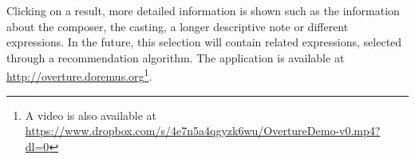 \documentclass[runningheads,a4paper]{llncs}
\begin{document}
Clicking on a result, more detailed information is shown such as the information about the composer, the casting, a longer descriptive note or different expressions. In the future, this selection will contain related expressions, selected through a recommendation algorithm. The application is available at \url{http://overture.doremus.org}\footnote{A video is also available at \url{https://www.dropbox.com/s/4e7n5a4qgyzk6wu/OvertureDemo-v0.mp4?dl=0}}.




\end{document}

